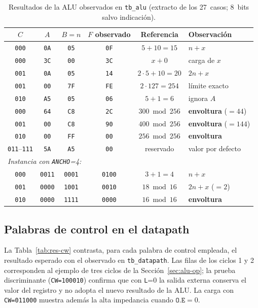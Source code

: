\documentclass[llncs]{llncs}
\begin{document}
\begin{table}[t]
  \centering
  \caption{Resultados de la ALU observados en \texttt{tb\_alu}
  (extracto de los 27~casos; 8~bits salvo indicación).}
  \label{tab:res-alu}
  \footnotesize
  \begin{tabular}{cccccl}
    \hline
    $C$ & $A$ & $B=n$ & $F$ observado & Referencia & Observación \\
    \hline
    \texttt{000} & \texttt{0A} & \texttt{05} & \texttt{0F} & $5+10=15$ & $n+x$ \\
    \texttt{000} & \texttt{3C} & \texttt{00} & \texttt{3C} & $x+0$ & carga de $x$ \\
    \texttt{001} & \texttt{0A} & \texttt{05} & \texttt{14} & $2\cdot5+10=20$ & $2n+x$ \\
    \texttt{001} & \texttt{00} & \texttt{7F} & \texttt{FE} & $2\cdot127=254$ & límite exacto \\
    \texttt{010} & \texttt{A5} & \texttt{05} & \texttt{06} & $5+1=6$ & ignora $A$ \\
    \texttt{000} & \texttt{64} & \texttt{C8} & \texttt{2C} & $300 \bmod 256$ & \textbf{envoltura} ($=44$) \\
    \texttt{001} & \texttt{00} & \texttt{C8} & \texttt{90} & $400 \bmod 256$ & \textbf{envoltura} ($=144$) \\
    \texttt{010} & \texttt{00} & \texttt{FF} & \texttt{00} & $256 \bmod 256$ & \textbf{envoltura} \\
    \texttt{011}--\texttt{111} & \texttt{5A} & \texttt{A5} & \texttt{00} & reservado & valor por defecto \\
    \hline
    \multicolumn{6}{l}{\emph{Instancia con \texttt{ANCHO}=4:}}\\
    \texttt{000} & \texttt{0011} & \texttt{0001} & \texttt{0100} & $3+1=4$ & $n+x$ \\
    \texttt{001} & \texttt{0000} & \texttt{1001} & \texttt{0010} & $18 \bmod 16$ & $2n+x$ ($=2$) \\
    \texttt{010} & \texttt{0000} & \texttt{1111} & \texttt{0000} & $16 \bmod 16$ & \textbf{envoltura} \\
    \hline
  \end{tabular}
\end{table}

\subsection{Palabras de control en el datapath}

La Tabla~\ref{tab:res-cw} contrasta, para cada palabra de control
empleada, el resultado esperado con el observado en \texttt{tb\_datapath}.
Las filas de los ciclos 1 y 2 corresponden al ejemplo de tres ciclos de la
Sección~\ref{sec:alu-op}; la prueba discriminante (\texttt{CW=100010})
confirma que con \texttt{L}=0 la salida externa conserva el valor del
registro y no adopta el nuevo resultado de la ALU. La carga con
\texttt{CW=011000} muestra además la alta impedancia cuando
$\mathtt{O.E}=0$.
\end{document}
